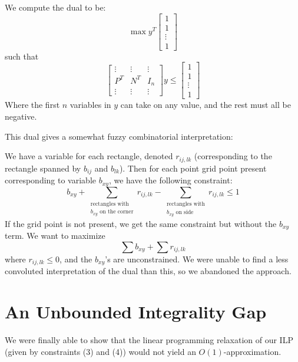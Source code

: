 \documentclass[11pt]{article}
\begin{document}
We compute the dual to be:
\[ \max y^T \left[ \begin{array}{c} 1 \\ 1 \\ \vdots \\ 1 \end{array} \right] \]
such that
\[ \left[ \begin{array}{ccc} \vdots & \vdots & \vdots \\
					  P^T & N^T & I_n \\
					\vdots & \vdots & \vdots \end{array} \right] y
\leq  \left[ \begin{array}{c} 1 \\ 1 \\ \vdots \\ 1 \end{array} \right] \]
Where the first $n$ variables in $y$ can take on any value, and the rest must all be negative. 

This dual gives a somewhat fuzzy combinatorial interpretation:

We have a variable for each rectangle, denoted $r_{ij, lk}$ (corresponding to the rectangle spanned by $b_{ij}$ and $b_{lk}$). Then for each point grid point present corresponding to variable $b_{xy}$, we have the following constraint:
\[ b_{xy} + \sum_{\begin{array}{c}\text{rectangles with}\\\text{$b_{xy}$ on the corner}\end{array}} r_{ij, lk} - \sum_{\begin{array}{c}\text{rectangles with}\\\text{$b_{xy}$ on side}\end{array}} r_{ij,lk} \leq 1 \]
If the grid point is not present, we get the same constraint but without the $b_{xy}$ term. We want to maximize
\[ \sum b_{xy} + \sum r_{ij,lk} \]
where $r_{ij,lk} \leq 0$, and the $b_{xy}$'s are unconstrained. We were unable to find a less convoluted interpretation of the dual than this, so we abandoned the approach.

\section{An Unbounded Integrality Gap}

We were finally able to show that the linear programming relaxation of our ILP (given by constraints (3) and (4)) would not yield an $O(1)$-approximation.
\end{document}
